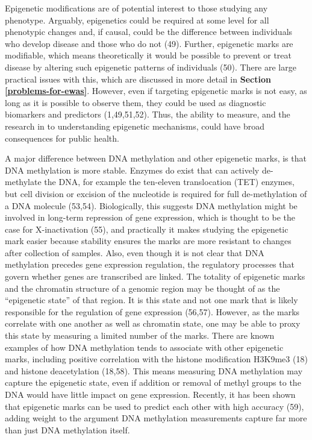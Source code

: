 \documentclass[11pt,oneside]{bristolthesis}
\begin{document}
Epigenetic modifications are of potential interest to those studying any phenotype. Arguably, epigenetics could be required at some level for all phenotypic changes and, if causal, could be the difference between individuals who develop disease and those who do not (49). Further, epigenetic marks are modifiable, which means theoretically it would be possible to prevent or treat disease by altering such epigenetic patterns of individuals (50). There are large practical issues with this, which are discussed in more detail in \textbf{Section \ref{problems-for-ewas}}. However, even if targeting epigenetic marks is not easy, as long as it is possible to observe them, they could be used as diagnostic biomarkers and predictors (1,49,51,52). Thus, the ability to measure, and the research in to understanding epigenetic mechanisms, could have broad consequences for public health.

A major difference between DNA methylation and other epigenetic marks, is that DNA methylation is more stable. Enzymes do exist that can actively de-methylate the DNA, for example the ten-eleven translocation (TET) enzymes, but cell division or excision of the nucleotide is required for full de-methylation of a DNA molecule (53,54). Biologically, this suggests DNA methylation might be involved in long-term repression of gene expression, which is thought to be the case for X-inactivation (55), and practically it makes studying the epigenetic mark easier because stability ensures the marks are more resistant to changes after collection of samples. Also, even though it is not clear that DNA methylation precedes gene expression regulation, the regulatory processes that govern whether genes are transcribed are linked. The totality of epigenetic marks and the chromatin structure of a genomic region may be thought of as the ``epigenetic state'' of that region. It is this state and not one mark that is likely responsible for the regulation of gene expression (56,57). However, as the marks correlate with one another as well as chromatin state, one may be able to proxy this state by measuring a limited number of the marks. There are known examples of how DNA methylation tends to associate with other epigenetic marks, including positive correlation with the histone modification H3K9me3 (18) and histone deacetylation (18,58). This means measuring DNA methylation may capture the epigenetic state, even if addition or removal of methyl groups to the DNA would have little impact on gene expression. Recently, it has been shown that epigenetic marks can be used to predict each other with high accuracy (59), adding weight to the argument DNA methylation measurements capture far more than just DNA methylation itself.
\end{document}
